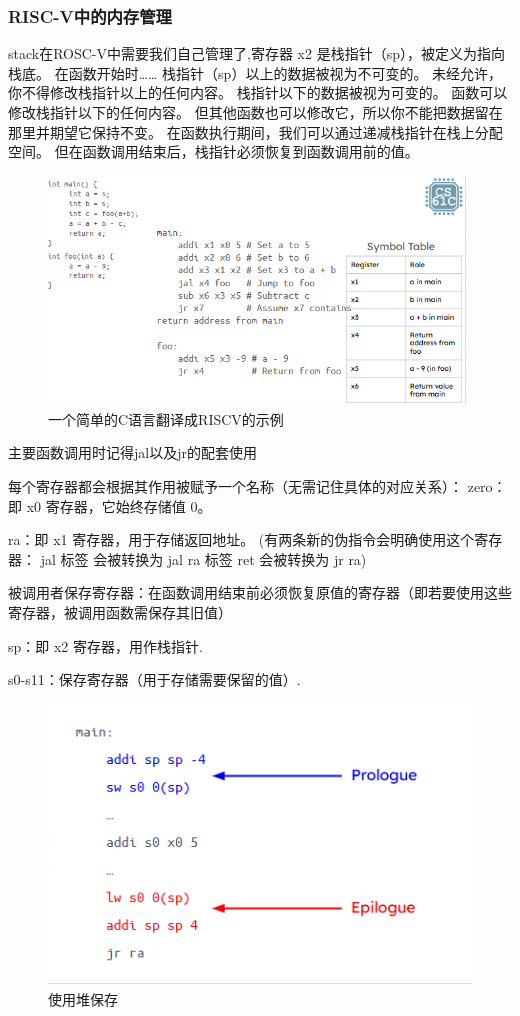 \documentclass{ctexart}
\begin{document}
\subsubsection{RISC-V中的内存管理}
stack在ROSC-V中需要我们自己管理了,寄存器 x2 是栈指针（sp），被定义为指向栈底。 在函数开始时……
栈指针（sp）以上的数据被视为不可变的。
未经允许，你不得修改栈指针以上的任何内容。
栈指针以下的数据被视为可变的。
函数可以修改栈指针以下的任何内容。
但其他函数也可以修改它，所以你不能把数据留在那里并期望它保持不变。
在函数执行期间，我们可以通过递减栈指针在栈上分配空间。
但在函数调用结束后，栈指针必须恢复到函数调用前的值。 \par
\begin{figure}
    \centering
    \includegraphics[width=0.5\linewidth]{一个简单的C语言翻译成RISCV的示例.png}
    \caption{一个简单的C语言翻译成RISCV的示例}
    \label{fig:enter-label}
    \end{figure}
    主要函数调用时记得jal以及jr的配套使用\par
    每个寄存器都会根据其作用被赋予一个名称（无需记住具体的对应关系）：
zero：即 x0 寄存器，它始终存储值 0。\par
ra：即 x1 寄存器，用于存储返回地址。
(有两条新的伪指令会明确使用这个寄存器：
jal 标签 会被转换为 jal ra 标签
ret 会被转换为 jr ra)\par
被调用者保存寄存器：在函数调用结束前必须恢复原值的寄存器（即若要使用这些寄存器，被调用函数需保存其旧值）\par
sp：即 x2 寄存器，用作栈指针.\par
s0-s11：保存寄存器（用于存储需要保留的值）.\par
\begin{figure}
    \centering
    \includegraphics[width=0.5\linewidth]{使用堆保存.png}
    \caption{使用堆保存}
    \label{fig:enter-label}
\end{figure}
\end{document}
